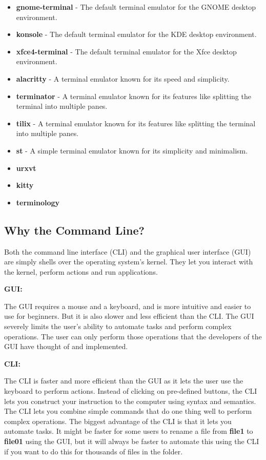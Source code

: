 \begin{itemize}
  \item
    \textbf{gnome-terminal} - The default terminal emulator for the GNOME desktop environment.
  \item
    \textbf{konsole} - The default terminal emulator for the KDE desktop environment.
  \item
    \textbf{xfce4-terminal} - The default terminal emulator for the Xfce desktop environment.
  \item
    \textbf{alacritty} - A terminal emulator known for its speed and simplicity.
  \item
    \textbf{terminator} - A terminal emulator known for its features like splitting the terminal into multiple panes.
  \item
    \textbf{tilix} - A terminal emulator known for its features like splitting the terminal into multiple panes.
  \item
    \textbf{st} - A simple terminal emulator known for its simplicity and minimalism.
  \item \textbf{urxvt}
  \item \textbf{kitty}
  \item \textbf{terminology}
\end{itemize}

\subsection{Why the Command Line?}

Both the command line interface (CLI) and the graphical user interface (GUI) are simply shells over the operating system's kernel.
They let you interact with the kernel, perform actions and run applications.

\textbf{GUI:}

The GUI requires a mouse and a keyboard, and is more intuitive and easier to use for beginners.
But it is also slower and less efficient than the CLI.
The GUI severely limits the user's ability to automate tasks and perform complex operations.
The user can only perform those operations that the developers of the GUI have thought of and implemented.

\textbf{CLI:}

The CLI is faster and more efficient than the GUI as it lets the user use the keyboard to perform actions.
Instead of clicking on pre-defined buttons, the CLI lets you construct your instruction to the computer using syntax and semantics.
The CLI lets you combine simple commands that do one thing well to perform complex operations.
The biggest advantage of the CLI is that it lets you automate tasks.
It might be faster for some users to rename a file from \textbf{file1} to \textbf{file01} using the GUI, but it will always be faster to automate this using the CLI if you want to do this for thousands of files in the folder.


